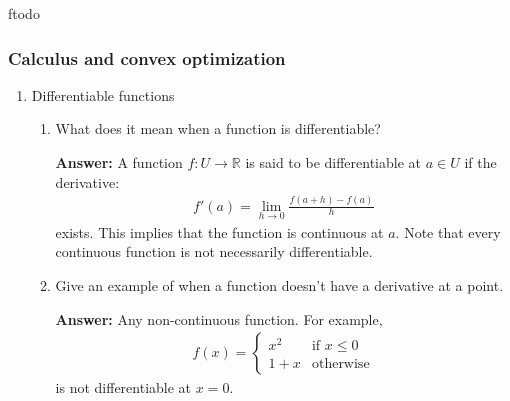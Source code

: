 ƒtodo\documentclass{article}
\newenvironment{QandA}{\begin{enumerate}[label=\arabic*.]}{\end{enumerate}}
\newenvironment{InnerQandA}{\begin{enumerate}[label=\roman*.]}{\end{enumerate}}
\newenvironment{answer}{\par\normalfont \textbf{Answer:}}{}
\newcommand{\R}{\mathbb{R}}
\begin{document}
\subsubsection{Calculus and convex optimization}
\begin{QandA}
    \item Differentiable functions
    \begin{InnerQandA}
        \item What does it mean when a function is differentiable?
        \begin{answer}
            A function $f: U \rightarrow \R$ is said to be differentiable at $a \in U$ if the derivative:
            \begin{align*}
                f'(a) = \lim_{h \rightarrow 0} \frac{f(a+h) - f(a)}{h}
            \end{align*}
            exists. This implies that the function is continuous at $a$. Note that every continuous function is not necessarily differentiable.
        \end{answer}

        \item Give an example of when a function doesn’t have a derivative at a point.  
        \begin{answer}
            Any non-continuous function. For example,
            \begin{align*}
                f(x) =
                    \begin{cases}
                    x^2 & \text{if } x \le 0\\
                    1+x & \text{otherwise}
                    \end{cases}
            \end{align*}
            is not differentiable at $x=0$.
        \end{answer}


\end{InnerQandA}
\end{QandA}
\end{document}
